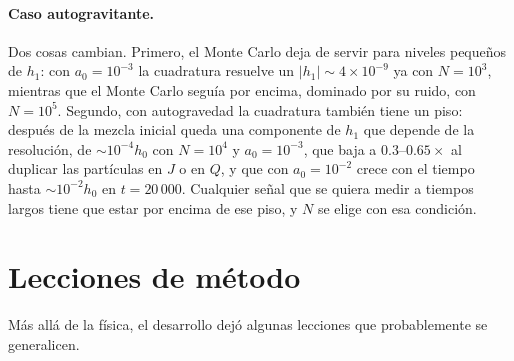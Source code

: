 \documentclass[11pt,a4paper]{article}
\newcommand{\Jr}{J}
\newcommand{\Qr}{Q}
\theoremstyle{definition}
\begin{document}
\paragraph{Caso autogravitante.} Dos cosas cambian. Primero, el Monte Carlo deja de
servir para niveles pequeños de $h_1$: con $a_0=10^{-3}$ la cuadratura resuelve un
$|h_1|\sim4\times10^{-9}$ ya con $N=10^3$, mientras que el Monte Carlo seguía por
encima, dominado por su ruido, con $N=10^5$. Segundo, con autogravedad la cuadratura
también tiene un piso: después de la mezcla inicial queda una componente de $h_1$ que
depende de la resolución, de $\sim10^{-4}h_0$ con $N=10^4$ y $a_0=10^{-3}$, que baja a
$0.3$--$0.65\times$ al duplicar las partículas en $\Jr$ o en $\Qr$, y que con
$a_0=10^{-2}$ crece con el tiempo hasta $\sim10^{-2}h_0$ en $t=20\,000$. Cualquier
señal que se quiera medir a tiempos largos tiene que estar por encima de ese piso,
y $N$ se elige con esa condición.

\section{Lecciones de método}

Más allá de la física, el desarrollo dejó algunas lecciones que probablemente se
generalicen.
\end{document}
